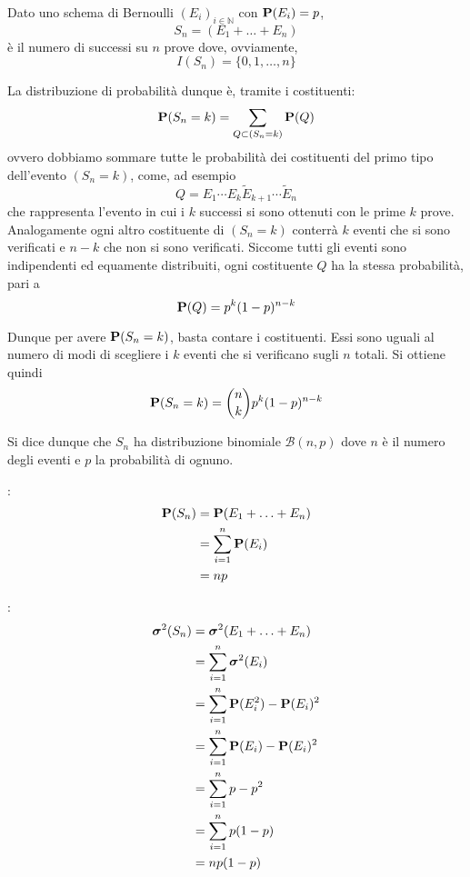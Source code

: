 Dato uno schema di Bernoulli \( (E_i)_{i \in \mathbb{N}} \) con \( \mathbf{P}(E_i) = p \),
\[ S_n = (E_1 + \ldots + E_n) \]
è il numero di successi su $n$ prove dove, ovviamente,
\[ I(S_n) = \{0,1, \ldots, n\} \]

La distribuzione di probabilità dunque è, tramite i costituenti:
\[ \mathbf{P}(S_n = k) = \sum_{Q \subset (S_n = k)} \mathbf{P}(Q) \]
ovvero dobbiamo sommare tutte le probabilità dei costituenti del primo tipo dell'evento \( (S_n = k) \), come, ad esempio
\[ Q = E_1 \cdots E_k \tilde{E}_{k+1} \cdots \tilde{E}_n \]
che rappresenta l'evento in cui i $k$ successi si sono ottenuti con le prime $k$ prove.
Analogamente ogni altro costituente di \( (S_n = k) \) conterrà $k$ eventi che si sono verificati e \( n-k \) che non si sono verificati.
Siccome tutti gli eventi sono indipendenti ed equamente distribuiti, ogni costituente $Q$ ha la stessa probabilità, pari a
\[ \mathbf{P}(Q) = p^k (1-p)^{n-k} \]

Dunque per avere \( \mathbf{P}(S_n = k) \), basta contare i costituenti.
Essi sono uguali al numero di modi di scegliere i $k$ eventi che si verificano sugli $n$ totali. Si ottiene quindi
\[ \mathbf{P}(S_n = k) = \binom{n}{k} p^k (1-p)^{n-k} \]

Si dice dunque che \( S_n \) ha distribuzione binomiale \( \mathcal{B}(n, p) \) dove $n$ è il numero degli eventi e $p$ la probabilità di ognuno.

:
\begin{align*}
  \mathbf{P}(S_n) &= \mathbf{P}(E_1 + \ldots + E_n) \\
  &= \sum_{i=1}^n \mathbf{P}(E_i) \\
  &= np
\end{align*}

:
\begin{align*}
  \boldsymbol\sigma^2(S_n) &= \boldsymbol\sigma^2(E_1 + \ldots + E_n) \\
  &= \sum_{i = 1}^n \boldsymbol\sigma^2(E_i) \\
  &= \sum_{i = 1}^n \mathbf{P}(E_i^2) - \mathbf{P}(E_i)^2 \\
  &= \sum_{i = 1}^n \mathbf{P}(E_i) - \mathbf{P}(E_i)^2 \\
  &= \sum_{i = 1}^n p - p^2 \\
  &= \sum_{i = 1}^n p (1 - p) \\
  &= n p (1 - p)
\end{align*}



